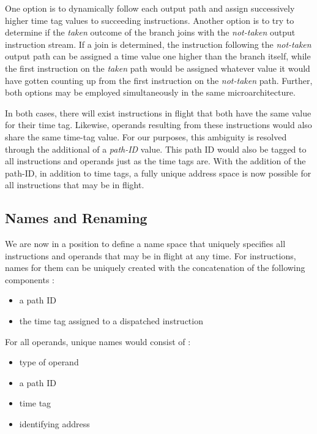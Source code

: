 \documentclass[10pt,dvips]{article}
\begin{document}
One option is to dynamically follow
each output path and assign successively higher time tag values
to succeeding instructions.
Another option is to try to determine if the \textit{taken} outcome
of the branch joins with the \textit{not-taken} output instruction
stream.  If a join is determined, the instruction following
the \textit{not-taken} output path can be assigned a time value
one higher than the branch itself, while the first instruction
on the \textit{taken} path would be assigned whatever value
it would have gotten counting up from the first instruction
on the \textit{not-taken} path.
Further, both options may be employed simultaneously in the
same microarchitecture.

In both cases, there will exist instructions in flight
that both have the same value for their time tag.  
Likewise,
operands resulting from these instructions would also share
the same time-tag value.
For our purposes, this ambiguity is resolved through the
additional of a \textit{path-ID} value.
This path ID would also be tagged to all instructions and
operands just as the time tags are.
With the addition of the path-ID, in addition to time tags,
a fully unique address space is now possible for
all instructions that may be in flight.
%
\subsection{Names and Renaming}
%
We are now in a position to define a name space that
uniquely specifies all instructions and operands that
may be in flight at any time.
For instructions, names for them can be uniquely created
with the concatenation of the following components :
%
\vspace{-0.05in}
\begin{itemize}
\vspace{-0.1in}
\item{a path ID}
\vspace{-0.1in}
\item{the time tag assigned to a dispatched instruction}
\vspace{-0.1in}
\end{itemize}   
%
For all operands, unique names would consist of :
%
\vspace{-0.05in}
\begin{itemize}
\vspace{-0.1in}
\item{type of operand}
\vspace{-0.1in}
\item{a path ID}
\vspace{-0.1in}
\item{time tag}
\vspace{-0.1in}
\item{identifying address}
\vspace{-0.1in}
\end{itemize}   
%
\end{document}

